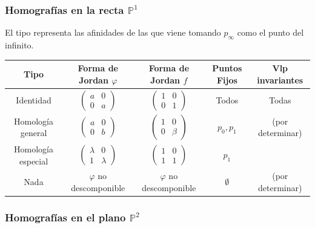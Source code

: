 \documentclass{myclass}
\begin{document}
\subsubsection{Homografías en la recta $\mathbb{P}^1$}
El tipo representa las afinidades de las que viene tomando $p_\infty$ como el punto del infinito.
\begin{center}
  \begin{tabular}{|c|c|c|c|c|}
	\hline
    Tipo & Forma de Jordan $\varphi $ & Forma de Jordan $f$ & Puntos Fijos & Vlp invariantes \\
	\hline
	Identidad  & $\begin{pmatrix} a & 0 \\ 0 & a \end{pmatrix} $ & $\begin{pmatrix} 1 & 0 \\ 0 & 1 \end{pmatrix} $ & Todos & Todas \\
	\hline
	Homología general & $\begin{pmatrix} a & 0 \\ 0 & b \end{pmatrix} $ & $\begin{pmatrix} 1 & 0 \\ 0 & \beta \end{pmatrix} $ & $p_0, p_1$ & (por determinar) \\
	\hline
	Homología especial & $\begin{pmatrix} \lambda & 0 \\ 1 & \lambda \end{pmatrix} $ & $\begin{pmatrix} 1 & 0 \\ 1 & 1 \end{pmatrix} $ & $p_1$ & \\
	\hline
	Nada & $\varphi$ no descomponible & $\varphi $ no descomponible & $\emptyset$ & (por determinar) \\
	\hline
  \end{tabular}
\end{center}

\subsubsection{Homografías en el plano $\mathbb{P}^2$}
\end{document}
